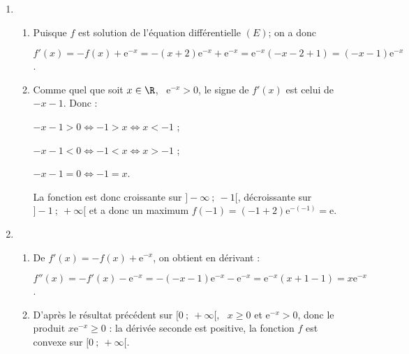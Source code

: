 \begin{enumerate}
\item %
	\begin{enumerate}
		\item %
Puisque $f$ est solution de l'équation différentielle $(E)$; on a donc 
		
$f'(x) = - f(x) + \text{e}^{-x} = -(x+2)\text{e}^{-x} + \text{e}^{-x} = \text{e}^{-x}(- x - 2 + 1) = (- x - 1)\text{e}^{-x}$.
		\item %


Comme quel que soit $x \in \R$, \, $\text{e}^{-x} > 0$, le signe de $f'(x)$ est celui de $- x - 1$. Donc :

$- x - 1 > 0 \iff - 1 > x \iff x < - 1$ ; 

$- x - 1 < 0 \iff - 1 < x \iff x > - 1$ ;

$- x - 1 = 0 \iff - 1 = x $.

La fonction est donc croissante sur $]- \infty~;~-1[$, décroissante sur $]- 1~;~+ \infty[$ et a donc un maximum $f(- 1) = (- 1 + 2)\text{e}^{-(-1)} = \text{e}$.
	\end{enumerate}
\item %
	\begin{enumerate}
		\item %
		De $f'(x) = -f(x) + \text{e}^{-x}$, on obtient en dérivant :
		
		$f''(x) = - f'(x) - \text{e}^{-x} = - (- x - 1)\text{e}^{-x} - \text{e}^{-x} = \text{e}^{-x}(x + 1 - 1) = x\text{e}^{-x}$.
		\item %
D'après le résultat précédent sur $[0~;~+\infty[$, \, $x \geqslant  0$ et $\text{e}^{-x} > 0$, donc le produit $x \text{e}^{-x} \geqslant 0$ : la dérivée seconde est positive, la fonction $f$ est convexe sur $[0~;~+\infty[$.
	\end{enumerate}
\end{enumerate}

\bigskip

